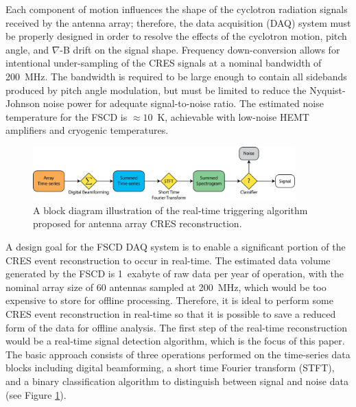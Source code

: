 Each component of motion influences the shape of the cyclotron radiation signals received by the antenna array; therefore, the data acquisition (DAQ) system must be properly designed in order to resolve the effects of the cyclotron motion, pitch angle, and $\nabla$-B drift on the signal shape. Frequency down-conversion allows for intentional under-sampling of the CRES signals at a nominal bandwidth of 200~MHz. The bandwidth is required to be large enough to contain all sidebands produced by pitch angle modulation, but must be limited to reduce the Nyquist-Johnson noise power for adequate signal-to-noise ratio. The estimated noise temperature for the FSCD is $\approx 10$~K, achievable with low-noise HEMT amplifiers and cryogenic temperatures.


\begin{figure}[htbp]
    \centering
    \includegraphics[width=0.9\textwidth]{figs/Chapter-4/230807_trigger_flow.png}
    \caption{A block diagram illustration of the real-time triggering algorithm proposed for antenna array CRES reconstruction.}
    \label{fig:signal_detection_routine}
\end{figure}

A design goal for the FSCD DAQ system is to enable a significant portion of the CRES event reconstruction to occur in real-time. The estimated data volume generated by the FSCD is 1~exabyte of raw data per year of operation, with the nominal array size of 60 antennas sampled at 200~MHz, which would be too expensive to store for offline processing. Therefore, it is ideal to perform some CRES event reconstruction in real-time so that it is possible to save a reduced form of the data for offline analysis. The first step of the real-time reconstruction would be a real-time signal detection algorithm, which is the focus of this paper. The basic approach consists of three operations performed on the time-series data blocks including digital beamforming, a short time Fourier transform (STFT), and a binary classification algorithm to distinguish between signal and noise data (see Figure \ref{fig:signal_detection_routine}). %


